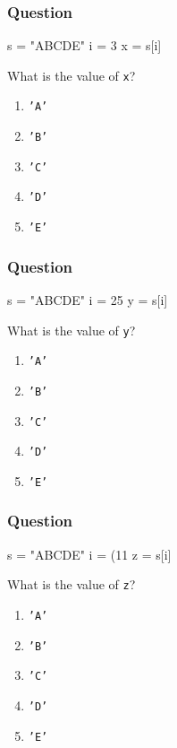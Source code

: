 \documentclass[11pt]{beamer}
\begin{document}
\begin{frame}[fragile]
  \frametitle{Question}
  \Enlarge

  \begin{semiverbatim}
s = "ABCDE"
i = 3
x = s[i]
  \end{semiverbatim}

  What is the value of \texttt{x}?
  \begin{enumerate}[label=\Alph*]
  \item  \texttt{'A'}
  \item  \texttt{'B'}
  \item  \texttt{'C'}
  \item  \texttt{'D'}
  \item  \texttt{'E'}
  \end{enumerate}
\end{frame}

\begin{frame}[fragile]
  \frametitle{Question}
  \Enlarge

  \begin{semiverbatim}
s = "ABCDE"
i = 25 %
y = s[i]
  \end{semiverbatim}

  What is the value of \texttt{y}?
  \begin{enumerate}[label=\Alph*]
  \item  \texttt{'A'}
  \item  \texttt{'B'}
  \item  \texttt{'C'}
  \item  \texttt{'D'}
  \item  \texttt{'E'}
  \end{enumerate}
\end{frame}

\begin{frame}[fragile]
  \frametitle{Question}
  \Enlarge

  \begin{semiverbatim}
s = "ABCDE"
i = (11 %
z = s[i]
  \end{semiverbatim}

  What is the value of \texttt{z}?
  \begin{enumerate}[label=\Alph*]
  \item  \texttt{'A'}
  \item  \texttt{'B'}
  \item  \texttt{'C'}
  \item  \texttt{'D'}
  \item  \texttt{'E'}
  \end{enumerate}
\end{frame}
\end{document}
